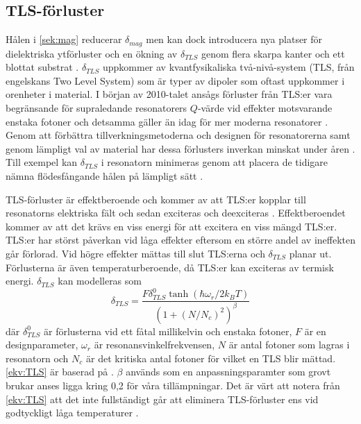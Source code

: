 \documentclass[main.tex]{subfiles}
\begin{document}

\subsection{TLS-förluster}
\label{sec:tls}
Hålen i \ref{sek:mag} reducerar $\delta_{mag}$ men kan dock introducera nya platser för dielektriska ytförluster och en ökning av $\delta_{TLS}$ genom flera skarpa kanter och ett blottat substrat \cite{Chiaro2016}. $\delta_{TLS}$ uppkommer av kvantfysikaliska två-nivå-system (TLS, från engelskans Two Level System) som är typer av dipoler som oftast uppkommer i orenheter i material. I början av 2010-talet ansågs förluster från TLS:er vara begränsande för supraledande resonatorers $Q$-värde vid effekter motsvarande enstaka fotoner \cite{Siddiqi2011} och detsamma gäller än idag för mer moderna resonatorer \cite{Boehme2016,Goetz2016}. Genom att förbättra tillverkningsmetoderna och designen för resonatorerna samt genom lämpligt val av material har dessa förlusters inverkan minskat under åren \cite{Oliver2013}. Till exempel kan $\delta_{TLS}$ i resonatorn minimeras genom att placera de tidigare nämna flödesfångande hålen på lämpligt sätt \cite{Chiaro2016}.

TLS-förluster är effektberoende och kommer av att TLS:er kopplar till resonatorns elektriska fält och sedan exciteras och deexciteras \cite{Boehme2016,Goetz2016}. 
Effektberoendet kommer av att det krävs en viss energi för att excitera en viss mängd TLS:er. TLS:er har störst påverkan vid låga effekter eftersom en större andel av ineffekten går förlorad. Vid högre effekter mättas till slut TLS:erna och $\delta_{TLS}$ planar ut. Förlusterna är även temperaturberoende, då TLS:er kan exciteras av termisk energi.
$\delta_{TLS}$ kan modelleras som
\begin{equation}
    \delta_{TLS}=\frac{F\delta_{TLS}^0\tanh{(\hbar\omega_r/2k_BT)}}{(1+(N/N_c)^2)^\beta}
    \label{ekv:TLS}
\end{equation}
där $\delta_{TLS}^0$ är förlusterna vid ett fåtal millikelvin och enstaka fotoner, $F$ är en designparameter, $\omega_r$ är resonansvinkelfrekvensen, $N$ är antal fotoner som lagras i resonatorn och $N_c$ är det kritiska antal fotoner för vilket en TLS blir mättad. \eqref{ekv:TLS} är baserad på \cite{pappas2011two}. $\beta$ används som en anpassningsparamter som grovt brukar anses \cite{faoro2012} ligga kring 0,2 för våra tillämpningar. Det är värt att notera från \eqref{ekv:TLS} att det inte fullständigt går att eliminera TLS-förluster ens vid godtyckligt låga temperaturer \cite{Boehme2016}.
\end{document}
